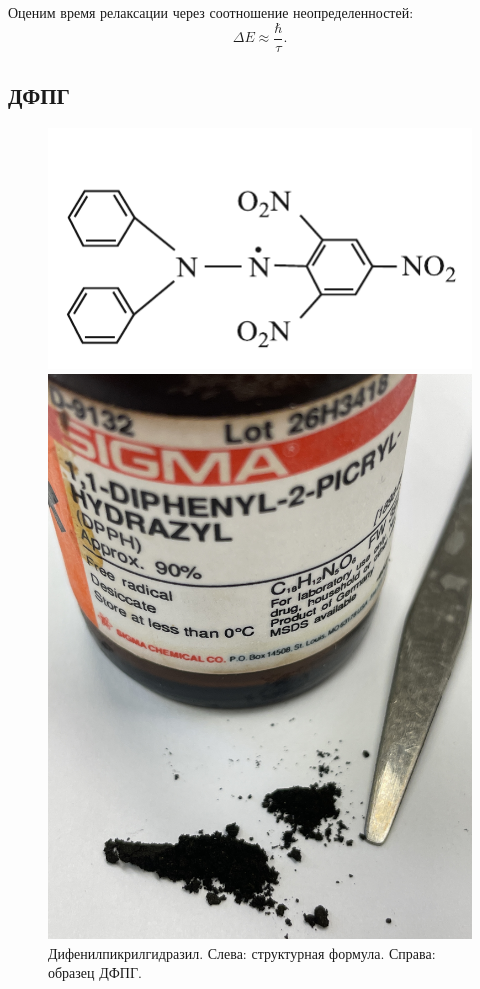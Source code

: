 \documentclass[12pt,a4paper]{article}
\begin{document}
	Оценим время релаксации через соотношение неопределенностей:
	\begin{equation}
		\Delta E \approx \frac{\hbar}{\tau}.
		\label{eq:relaxation}
	\end{equation}
	
	\subsection*{ДФПГ}
	
	\begin{figure}[H]
		\centering
		\begin{minipage}{0.6\textwidth}
			\centering
			\includegraphics[width=0.7\linewidth]{res/dfpg_struct.png}
		\end{minipage}%
		\begin{minipage}{0.4\textwidth}
			\centering
			\includegraphics[width=0.7\linewidth]{res/dfpg.jpg}
		\end{minipage}
		\caption{Дифенилпикрилгидразил. Слева: структурная формула. Справа: образец ДФПГ.}
		\label{fig:dfpg}
	\end{figure}
	
\end{document}
